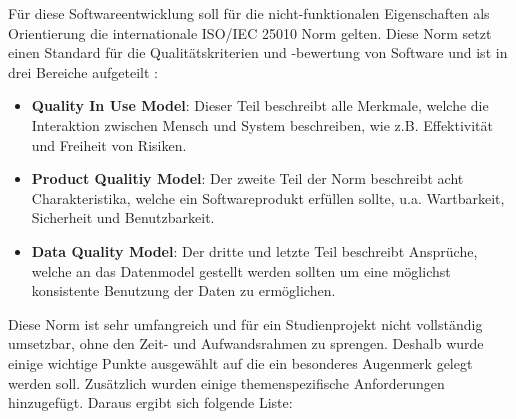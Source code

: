\vspace{0.25cm}

Für diese Softwareentwicklung soll für die nicht-funktionalen Eigenschaften als Orientierung die internationale ISO/IEC 25010 Norm gelten. Diese Norm setzt einen Standard für die Qualitätskriterien und -bewertung von Software und ist in drei Bereiche aufgeteilt \cite{ISO.2011} \cite{Braun.2016}:

\begin{itemize}
	\item \textbf{Quality In Use Model}: Dieser Teil beschreibt alle Merkmale, welche die Interaktion zwischen Mensch und System beschreiben, wie z.B. Effektivität und Freiheit von Risiken.
	\item \textbf{Product Qualitiy Model}: Der zweite Teil der Norm beschreibt acht Charakteristika, welche ein Softwareprodukt erfüllen sollte, u.a. Wartbarkeit, Sicherheit und Benutzbarkeit.
	\item \textbf{Data Quality Model}: Der dritte und letzte Teil beschreibt Ansprüche, welche an das Datenmodel gestellt werden sollten um eine möglichst konsistente Benutzung der Daten zu ermöglichen.
\end{itemize}

Diese Norm ist sehr umfangreich und für ein Studienprojekt nicht vollständig umsetzbar, ohne den Zeit- und Aufwandsrahmen zu sprengen. Deshalb wurde einige wichtige Punkte ausgewählt auf die ein besonderes Augenmerk gelegt werden soll. Zusätzlich wurden einige themenspezifische Anforderungen hinzugefügt. Daraus ergibt sich folgende Liste:

